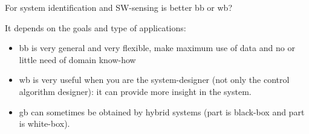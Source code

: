 \begin{remark}
    For system identification and SW-sensing is better \acrlong{bb} or \acrlong{wb}?

    It depends on the goals and type of applications:

    \begin{itemize}
        \item \gls{bb} is very general and very flexible, make maximum use of data and no or little need of domain know-how 
        \item \gls{wb} is very useful when you are the system-designer (not only the control algorithm designer): it can provide more insight in the system.
        \item \gls{gb} can sometimes be obtained by hybrid systems (part is black-box and part is white-box).
    \end{itemize}
\end{remark}